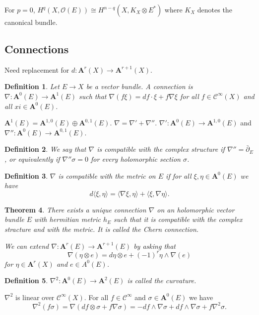 \documentclass[12pt]{article}
\theoremstyle{darkgreentheorem}
\newtheorem{thm}{Theorem}[section]
\theoremstyle{darkbluedefinition}
\newtheorem{defn}[thm]{Definition}
\theoremstyle{darkredexample}
\theoremstyle{remark}
\newcommand{\1}{\mathbbm{1}}
\newcommand{\A}{\mathbf{A}}
\newcommand{\calC}{\mathcal{C}}
\renewcommand{\O}{\mathcal{O}}
\newcommand{\ot}{\otimes}
\newcommand{\op}{\oplus}
\begin{document}
For $p=0$, $H^{q}(X,\O(E))\cong H^{n-q}(X,K_{X}\ot E^{*})$ where $K_{X}$ denotes the canonical bundle.

\subsection{Connections}

Need replacement for $d\colon \A^{r}(X)\to \A^{r+1}(X)$.

\begin{defn}
    Let $E\to X$ be a vector bundle.
    A \textit{connection} is $\nabla \colon \A^{0}(E)\to \A^{1}(E)$ such that $\nabla(f\xi)=df\cdot \xi + f\nabla \xi$ for all $f\in \calC^{\infty}(X)$ and all $xi\in \A^{0}(E)$.
\end{defn}

$\A^{1}(E)=\A^{1,0}(E)\op \A^{0,1}(E)$.
$\nabla =\nabla'+ \nabla''$.
$\nabla'\colon \A^{0}(E)\to \A^{1,0}(E)$ and $\nabla''\colon \A^{0}(E)\to \A^{0,1}(E)$.

\begin{defn}
    We say that $\nabla $ is compatible with the complex structure if $\nabla''=\bar{\partial}_{E}$, or equivalently if $\nabla''\sigma=0$ for every holomorphic section $\sigma$.
\end{defn}

\begin{defn}
    $\nabla$ is compatible with the metric on $E$ if for all $\xi,\eta\in \A^{0}(E)$ we have
    \[ d\langle \xi ,\eta \rangle =\langle \nabla \xi ,\eta\rangle + \langle \xi,\nabla\eta \rangle.\]
\end{defn}

\begin{thm}
    There exists a unique connection $\nabla$ on an holomorphic vector bundle $E$ with hermitian metric $h_{E}$ such that it is compatible with the complex stracture and with the metric.
    It is called the \textit{Chern connection}.

    We can extend $\nabla \colon \A^{r}(E)\to \A^{r+1}(E)$ by asking that
    \[ \nabla(\eta\ot e)=d\eta \ot e+(-1)^{r}\eta \wedge \nabla(e) \]
    for $\eta \in \A^{r}(X)$ and $e\in A^{0}(E)$.
\end{thm}

\begin{defn}
    $\nabla^{2}\colon \A^{0}(E)\to \A^{2}(E)$ is called the \textit{curvature}.
\end{defn}

$\nabla^{2}$ is linear over $\calC^{\infty}(X)$.
For all $f\in \calC^{\infty}$ and $\sigma \in \A^{0}(E)$ we have
\[ \nabla^{2}(f\sigma)=\nabla(df\ot \sigma + f\nabla \sigma)=-df\wedge \nabla\sigma +df\wedge \nabla \sigma +f\nabla^{2}\sigma.\]
\end{document}
